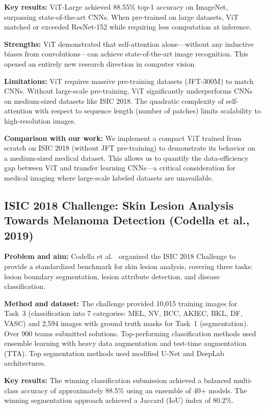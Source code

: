 \documentclass[10pt,twocolumn]{article}
\begin{document}
\textbf{Key results:} ViT-Large achieved 88.55\% top-1 accuracy on ImageNet, surpassing state-of-the-art CNNs. When pre-trained on large datasets, ViT matched or exceeded ResNet-152 while requiring less computation at inference.

\textbf{Strengths:} ViT demonstrated that self-attention alone---without any inductive biases from convolutions---can achieve state-of-the-art image recognition. This opened an entirely new research direction in computer vision.

\textbf{Limitations:} ViT requires massive pre-training datasets (JFT-300M) to match CNNs. Without large-scale pre-training, ViT significantly underperforms CNNs on medium-sized datasets like ISIC 2018. The quadratic complexity of self-attention with respect to sequence length (number of patches) limits scalability to high-resolution images.

\textbf{Comparison with our work:} We implement a compact ViT trained from scratch on ISIC 2018 (without JFT pre-training) to demonstrate its behavior on a medium-sized medical dataset. This allows us to quantify the data-efficiency gap between ViT and transfer learning CNNs---a critical consideration for medical imaging where large-scale labeled datasets are unavailable.

\subsection{ISIC 2018 Challenge: Skin Lesion Analysis Towards Melanoma Detection (Codella et al., 2019)}

\textbf{Problem and aim:} Codella et al.\ \cite{Codella2018} organized the ISIC 2018 Challenge to provide a standardized benchmark for skin lesion analysis, covering three tasks: lesion boundary segmentation, lesion attribute detection, and disease classification.

\textbf{Method and dataset:} The challenge provided 10,015 training images for Task~3 (classification into 7 categories: MEL, NV, BCC, AKIEC, BKL, DF, VASC) and 2,594 images with ground truth masks for Task~1 (segmentation). Over 900 teams submitted solutions. Top-performing classification methods used ensemble learning with heavy data augmentation and test-time augmentation (TTA). Top segmentation methods used modified U-Net and DeepLab architectures.

\textbf{Key results:} The winning classification submission achieved a balanced multi-class accuracy of approximately 88.5\% using an ensemble of 40+ models. The winning segmentation approach achieved a Jaccard (IoU) index of 80.2\%.
\end{document}
